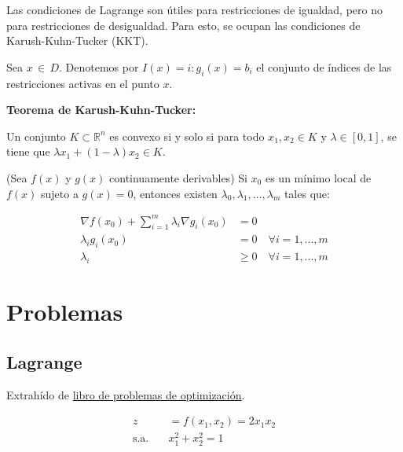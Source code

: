 \documentclass{article}
\newenvironment{question}
{\begin{mdframed}[backgroundcolor=white]}
{\end{mdframed}}
\begin{document}
Las condiciones de Lagrange son útiles para restricciones de igualdad, pero no para restricciones de desigualdad. Para esto, se ocupan las condiciones de Karush-Kuhn-Tucker (KKT).

Sea $x \, \in \, D$. Denotemos por $I(x)={i:g_i(x)=b_i}$ el conjunto de índices de las restricciones activas en el punto $x$.

\textbf{Teorema de Karush-Kuhn-Tucker:}

Un conjunto $K \subset \mathbb{R}^n$ es convexo si y solo si para todo $x_1, x_2 \in K$ y $\lambda \in [0, 1]$, se tiene que $\lambda x_1 + (1 - \lambda) x_2 \in K$.

(Sea $f(x)$ y $g(x)$ continuamente derivables) Si $x_0$ es un mínimo local de $f(x)$ sujeto a $g(x) = 0$, entonces existen $\lambda_0, \lambda_1, \ldots, \lambda_m$ tales que:

\begin{align*}
    \nabla f(x_0) + \sum_{i=1}^{m} \lambda_i \nabla g_i(x_0) & = 0                                   \\
    \lambda_i g_i(x_0)                                       & = 0 \quad \forall i = 1, \ldots, m    \\
    \lambda_i                                                & \geq 0 \quad \forall i = 1, \ldots, m
\end{align*}


\section{Problemas}

\subsection{Lagrange} \label{problemas:lagrangiano}

\begin{question}
    Extrahído de \href{https://www.bbau.ac.in/dept/UIET/EME-601%20Operation%20Research.pdf}{libro de problemas de optimización}.

    \begin{align*}
        z \quad           & =f(x_1,x_2)=2x_1x_2 \\
        \text{s.a.} \quad & x_1^2+x_2^2=1
    \end{align*}
\end{question}
\end{document}
